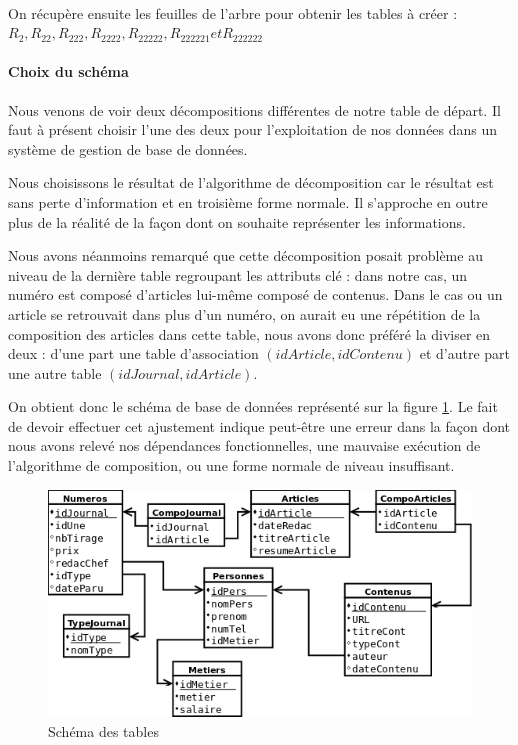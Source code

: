 \paragraph{}{On récupère ensuite les feuilles de l'arbre pour obtenir les tables à créer : $R_{2}, R_{22}, R_{222}, R_{2222}, R_{22222}, R_{222221} et R_{222222}$}

\paragraph{Choix du schéma}{
    Nous venons de voir deux décompositions différentes de notre table de départ. Il faut à présent choisir l'une des deux pour l'exploitation de nos données dans un système de gestion de base de données.
    
    Nous choisissons le résultat de l'algorithme de décomposition car le résultat est sans perte d'information et en troisième forme normale. Il s'approche en outre plus de la réalité de la façon dont on souhaite représenter les informations.
    
    Nous avons néanmoins remarqué que cette décomposition posait problème au niveau de la dernière table regroupant les attributs clé : dans notre cas, un numéro est composé d'articles lui-même composé de contenus. Dans le cas ou un article se retrouvait dans plus d'un numéro, on aurait eu une répétition de la composition des articles dans cette table, nous avons donc préféré la diviser en deux : d'une part une table d'association $(idArticle, idContenu)$ et d'autre part une autre table $(idJournal, idArticle)$. 
    
    On obtient donc le schéma de base de données représenté sur la figure \ref{schema_db}. Le fait de devoir effectuer cet ajustement indique peut-être une erreur dans la façon dont nous avons relevé nos dépendances fonctionnelles, une mauvaise exécution de l'algorithme de composition, ou une forme normale de niveau insuffisant.
    
}

\begin{figure}
    \centering
    \includegraphics[scale=0.5]{figures/tables_schema.png}
    \caption{Schéma des tables}
    \label{schema_db}
\end{figure}